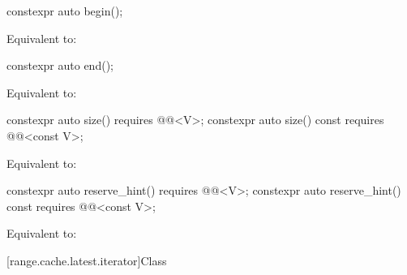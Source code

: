 %
\begin{itemdecl}
constexpr auto begin();
\end{itemdecl}

\begin{itemdescr}
\pnum
\effects
Equivalent to: 
\end{itemdescr}

%
\begin{itemdecl}
constexpr auto end();
\end{itemdecl}

\begin{itemdescr}
\pnum
\effects
Equivalent to: 
\end{itemdescr}

%
\begin{itemdecl}
constexpr auto size() requires @@<V>;
constexpr auto size() const requires @@<const V>;
\end{itemdecl}

\begin{itemdescr}
\pnum
\effects
Equivalent to: 
\end{itemdescr}

%
\begin{itemdecl}
constexpr auto reserve_hint() requires @@<V>;
constexpr auto reserve_hint() const requires @@<const V>;
\end{itemdecl}

\begin{itemdescr}
\pnum
\effects
Equivalent to: 
\end{itemdescr}

[range.cache.latest.iterator]{Class }


